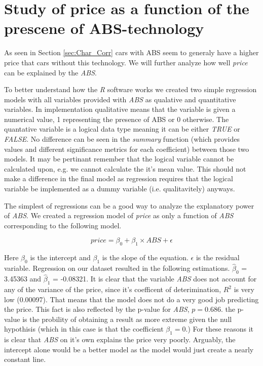 \section{Study of price as a function of the prescene of ABS-technology} %
\label{sec:price_abs}

As seen in Section \ref{sec:Char_Corr} cars with ABS seem to generaly have a higher price that cars without this technology. We will further analyze how well \textit{price} can be explained by the \textit{ABS}.

\noindent
To better understand how the \textit{R} software works we created two simple regression models with all variables provided with \textit{ABS} as qualative and quantitative variables. In implementation qualitative means that the variable is given a numerical value, 1 representing the presence of ABS or 0 otherwise. The quantative variable is a logical data type meaning it can be either \textit{TRUE} or \textit{FALSE}. No difference can be seen in the \textit{summary} function (which provides values and different significance metrics for each coefficient) between those two models. It may be pertinant remember that the logical variable cannot be calculated upon, e.g. we cannot calculate the it's mean value. This should not make a difference in the final model as regression requires that the logical variable be implemented as a dummy variable (i.e. qualitavitely) anyways.

\noindent
The simplest of regressions can be a good way to analyze the explanatory power of \textit{ABS}. We created a regression model of \textit{price} as only a function of \textit{ABS} corresponding to the following model.

\begin{equation}
	price = \beta_0 + \beta_1 \times ABS + \epsilon
\end{equation}

\noindent
Here $\beta_0$ is the intercept and $\beta_1$ is the slope of the equation. $\epsilon$ is the residual variable. Regression on our dataset resulted in the following estimations. $\hat{\beta}_0$ = 3.45363 and $\hat{\beta}_1$ = -0.08321. It is clear that the variable \textit{ABS} does not account for any of the variance of the price, since it's coefficent of deterimination, $R^2$ is very low (0.00097). That means that the model does not do a very good job predicting the price. This fact is also reflected by the p-value for \textit{ABS}, $p=0.686$. the p-value is the probility of obtaining a result as more extreme given the null hypothisis (which in this case is that the coefficient $\beta_1 = 0$.) For these reasons it is clear that \textit{ABS} on it's own explains the price very poorly. Arguably, the intercept alone would be a better model as the model
would just create a nearly constant line.

